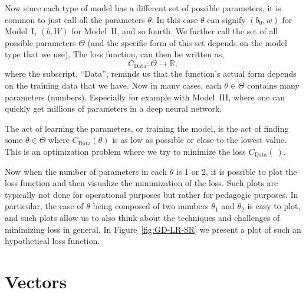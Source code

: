 \documentclass[12pt]{article}
\begin{document}
Now since each type of model has a different set of possible parameters, it is common to just call all the parameters $\theta$. In this case $\theta$ can signify $(b_0,w)$ for Model~I, $(b, W)$ for Model~II, and so fourth. We further call the set of all possible parameters $\Theta$ (and the specific form of this set depends on the model type that we use). The loss function, can then be written as,
%
\begin{equation}
C_{\textrm{Data}}: \Theta \to {\mathbb R},
\end{equation}
%
where the subscript, ``Data'', reminds us that the function's actual form depends on the training data that we have. Now in many cases, each $\theta \in \Theta$ contains many parameters (numbers). Especially for example with Model~III, where one can quickly get millions of parameters in a deep neural network.



The act of learning the parameters, or training the model, is the act of finding some $\theta \in \Theta$ where $C_{\textrm{Data}}(\theta)$ is as low as possible or close to the lowest value. This is an optimization problem where we try to minimize the loss $C_{\textrm{Data}}(~)$.

Now when the number of parameters in each $\theta$ is $1$ or $2$, it is possible to plot the loss function and then visualize the minimization of the loss. Such plots are typically not done for operational purposes but rather for pedagogic purposes. In particular, the case of $\theta$ being composed of two numbers $\theta_1$ and $\theta_2$ is easy to plot, and such plots allow us to also think about the techniques and challenges of minimizing loss in general. In Figure~\ref{fig:GD-LR-SR} we present a plot of such an hypothetical loss function.

\section{Vectors}
\label{sec:vectors}
\end{document}
